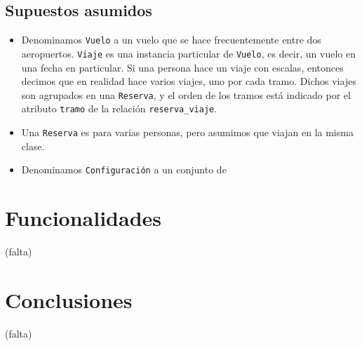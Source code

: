\documentclass[a4paper,10pt]{article}
\begin{document}
\subsection{Supuestos asumidos}

\begin{itemize}
 \item Denominamos \texttt{Vuelo} a un vuelo que se hace frecuentemente entre dos aeropuertos. \texttt{Viaje} es una instancia particular de \texttt{Vuelo}, es decir, un vuelo en una fecha en particular. Si una persona hace un viaje con escalas, entonces decimos que en realidad hace varios viajes, uno por cada tramo. Dichos viajes son agrupados en una \texttt{Reserva}, y el orden de los tramos est\'a indicado por el atributo \texttt{tramo} de la relaci\'on \texttt{reserva\_viaje}.

  \item Una \texttt{Reserva} es para varias personas, pero asumimos que viajan en la misma clase.

  \item Denominamos \texttt{Configuración} a un conjunto de 
\end{itemize}

\newpage
\section{Funcionalidades}

(falta)

\newpage
\section{Conclusiones}

(falta)
\end{document}
